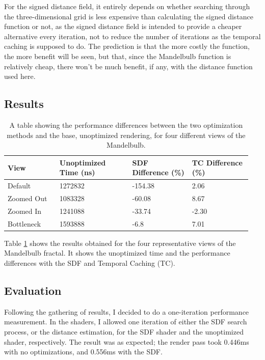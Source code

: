 For the signed distance field, it entirely depends on whether searching through the three-dimensional grid is less expensive than calculating the signed distance function or not, as the signed distance field is intended to provide a cheaper alternative every iteration, not to reduce the number of iterations as the temporal caching is supposed to do. The prediction is that the more costly the function, the more benefit will be seen, but that, since the Mandelbulb function is relatively cheap, there won't be much benefit, if any, with the distance function used here.

\subsection{Results}

\begin{table}[ht]
	\centering
	\begin{tabular}{||p{0.2\linewidth}|p{0.29\linewidth}|p{0.23\linewidth}|p{0.23\linewidth}||}
		\hline
		View & Unoptimized Time (ns) & SDF Difference (\%) & TC Difference (\%)\\
		\hline\hline
		Default & 1272832 & -154.38 & 2.06\\
		\hline
		Zoomed Out & 1083328 & -60.08 & 8.67\\
		\hline
		Zoomed In & 1241088 & -33.74 & -2.30\\
		\hline
		Bottleneck & 1593888 & -6.8 & 7.01\\
		\hline
	\end{tabular}
	\caption{A table showing the performance differences between the two optimization methods and the base, unoptimized rendering, for four different views of the Mandelbulb.}
	\label{table:mandelbulb-static-results}
\end{table}

Table \ref{table:mandelbulb-static-results} shows the results obtained for the four representative views of the Mandelbulb fractal. It shows the unoptimized time and the performance differences with the SDF and Temporal Caching (TC).

\subsection{Evaluation}

Following the gathering of results, I decided to do a one-iteration performance measurement. In the shaders, I allowed one iteration of either the SDF search process, or the distance estimation, for the SDF shader and the unoptimized shader, respectively. The result was as expected; the render pass took 0.446ms with no optimizations, and 0.556ms with the SDF.

